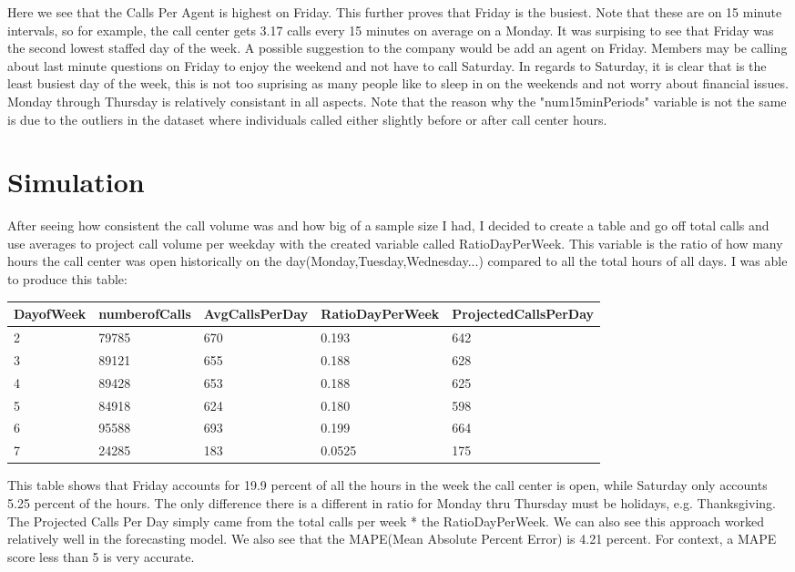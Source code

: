 \documentclass[12pt]{article}
\begin{document}
Here we see that the Calls Per Agent is highest on Friday. This further proves that Friday is the busiest. Note that these are on 15 minute intervals,
so for example, the call center gets 3.17 calls every 15 minutes on average on a Monday. It was surpising to see that Friday was the second
lowest staffed day of the week. A possible suggestion to the company would be add an agent on Friday. Members may be calling about last minute
questions on Friday to enjoy the weekend and not have to call Saturday. In regards to Saturday, it is clear that is the least busiest day of the week,
this is not too suprising as many people like to sleep in on the weekends and not worry about financial issues. Monday through Thursday is relatively
consistant in all aspects. Note that the reason why the "num15minPeriods" variable is not the same is due to the outliers in the dataset where individuals
called either slightly before or after call center hours.
\section*{Simulation}
After seeing how consistent the call volume was and how big of a sample size I had, I decided to create a table and go off total calls and use averages to project call volume per weekday with the 
created variable called RatioDayPerWeek. This variable is the ratio of how many hours the call center was open historically on the day(Monday,Tuesday,Wednesday...) compared to all the total hours of all days.
I was able to produce this table:
\begin{table}[H]
  \resizebox{\textwidth}{!} {
  \begin{tabular}{ l | l | l | l | l |}
    {\bf DayofWeek} & {\bf numberofCalls} & {\bf AvgCallsPerDay} & {\bf RatioDayPerWeek} & {\bf ProjectedCallsPerDay} \\
  \hline
  2 & 79785 & 670 & 0.193 & 642 \\
  \hline
  3 & 89121 & 655 & 0.188 & 628 \\
  \hline
  4 & 89428 & 653 & 0.188 & 625 \\
  \hline
  5 & 84918 & 624 & 0.180 & 598 \\
  \hline
  6 & 95588 & 693 & 0.199 & 664 \\
  \hline
  7 & 24285 & 183 & 0.0525 & 175\\
  \end{tabular}
  }
  \end{table}
This table shows that Friday accounts for 19.9 percent of all the hours in the week the call center is open, while Saturday only accounts
5.25 percent of the hours. The only difference there is a different in ratio for Monday thru Thursday must be holidays, e.g. Thanksgiving. 
The Projected Calls Per Day simply came from the total calls per week * the RatioDayPerWeek. We can also see this approach worked relatively well in the forecasting model. 
We also see that the MAPE(Mean Absolute Percent Error) is 4.21 percent. For context, a MAPE score less than 5 is very accurate.
\end{document}

